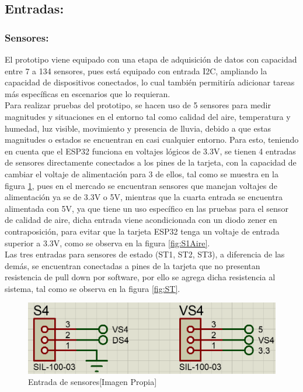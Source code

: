 	\subsection{Entradas:}
	\subsubsection{Sensores:}
		El prototipo viene equipado con una etapa de adquisición de datos con capacidad entre 7 a 134 sensores, pues está equipado con entrada I2C, ampliando la capacidad de dispositivos conectados, lo cual también permitiría adicionar tareas más específicas en escenarios que lo requieran.\\
		
		Para realizar pruebas del prototipo, se hacen uso de 5 sensores para medir magnitudes y situaciones en el entorno tal como calidad del aire, temperatura y humedad, luz visible, movimiento y presencia de lluvia, debido a que estas magnitudes o estados se encuentran en casi cualquier entorno. Para esto, teniendo en cuenta que el ESP32 funciona en voltajes lógicos de 3.3V, se tienen 4 entradas de sensores directamente conectados a los pines de la tarjeta, con la capacidad de cambiar el voltaje de alimentación para 3 de ellos, tal como se muestra en la figura \ref{fig:SVS}, pues en el mercado se encuentran sensores que manejan voltajes de alimentación ya se de 3.3V o 5V, mientras que la cuarta entrada se encuentra alimentada con 5V, ya que tiene un uso específico en las pruebas para el sensor de calidad de aire, dicha entrada viene acondicionada con un diodo zener en contraposición, para evitar que la tarjeta ESP32 tenga un voltaje de entrada superior a 3.3V, como se observa en la figura \ref{fig:S1Aire}.\\
		
		Las tres entradas para sensores de estado (ST1, ST2, ST3), a diferencia de las demás, se encuentran conectadas a pines de la tarjeta que no presentan resistencia de pull down por software, por ello se agrega dicha resistencia al sistema, tal como se observa en la figura \ref{fig:ST}.\\
		
		\begin{figure}[H]
			\centering
			\caption{Entrada de sensores[Imagen Propia]}
			\label{fig:SVS}
			\includegraphics[width=0.7\linewidth]{Imagenes/SVS}
		\end{figure}
	

